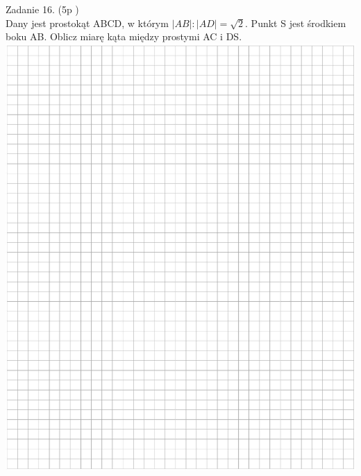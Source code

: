 \documentclass[10pt]{article}
\begin{document}
Zadanie 16. (5p )\\
Dany jest prostokąt ABCD, w którym \(|A B|:|A D|=\sqrt{2}\). Punkt S jest środkiem boku AB. Oblicz miarę kąta między prostymi AC i DS.\\
\includegraphics[max width=\textwidth, center]{2024_11_21_12a27a32a51fef2c834ag-13}
\end{document}
